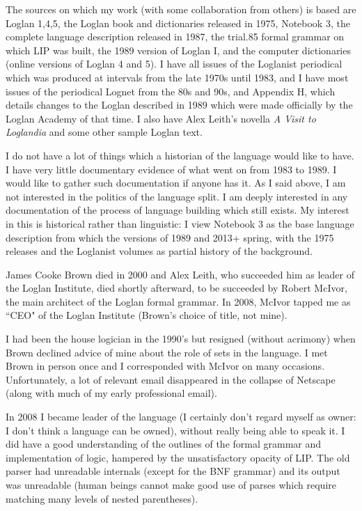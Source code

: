 \documentclass[12pt]{article}
\begin{document}
The sources on which my work (with some collaboration from others) is based are Loglan 1,4,5, the Loglan book and dictionaries released in 1975, Notebook 3, the complete language description released in 1987, the trial.85 formal grammar on which LIP was built, the 1989 version of Loglan I, and the computer dictionaries (online versions of Loglan 4 and 5).  I have all issues of the Loglanist periodical which was produced at intervals from the late 1970s until 1983, and I have most issues of the periodical Lognet from the 80s and 90s, and Appendix H, which details changes to the Loglan described in 1989 which were made officially by the Loglan Academy of that time.  I also have Alex Leith's novella  {\em A Visit to Loglandia\/} and some other sample Loglan text.

I do not have a lot of things which a historian of the language would like to have.  I have very little documentary evidence of what went on from 1983 to 1989.  I would like to gather such documentation if anyone has it.  As I said above, I am not interested in the politics of the language split.  I am deeply interested in any documentation of the process of language building which still exists.  My interest in this is historical rather than linguistic:  I view Notebook 3 as the base language description from which the versions of 1989 and 2013+ spring, with the 1975 releases and the Loglanist volumes as partial history of the background.

James Cooke Brown died in 2000 and Alex Leith, who succeeded him as leader of the Loglan Institute, died shortly afterward, to be succeeded by Robert McIvor, the main architect of the Loglan formal grammar.  In 2008, McIvor tapped me as ``CEO" of the Loglan Institute (Brown's choice of title, not mine).

I had been the house logician in the 1990's but resigned (without acrimony) when Brown declined advice of mine about the role of sets in the language.  I met Brown in person once and I corresponded with McIvor on many occasions.  Unfortunately, a lot of relevant email disappeared in the collapse of Netscape (along with much of my early professional email).

In 2008 I became leader of the language (I certainly don't regard myself as owner:  I don't think a language can be owned), without really being able to speak it.
I did have a good understanding of the outlines of the formal grammar and implementation of logic, hampered by the unsatisfactory opacity of LIP.  The old parser
had unreadable internals (except for the BNF grammar) and its output was unreadable (human beings cannot make good use of parses which require matching many levels of nested parentheses).
\end{document}
